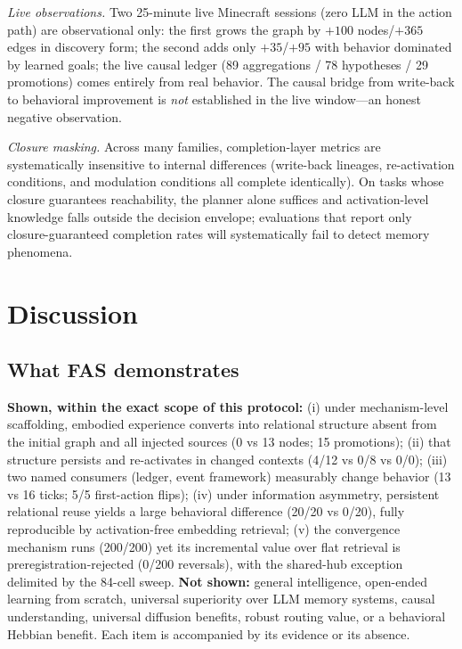 \documentclass[10pt,a4paper]{article}
\begin{document}
\emph{Live observations.} Two 25-minute live Minecraft sessions (zero LLM in the action path) are observational only: the first grows the graph by $+100$ nodes/$+365$ edges in discovery form; the second adds only $+35$/$+95$ with behavior dominated by learned goals; the live causal ledger (89 aggregations / 78 hypotheses / 29 promotions) comes entirely from real behavior. The causal bridge from write-back to behavioral improvement is \emph{not} established in the live window---an honest negative observation.

\emph{Closure masking.} Across many families, completion-layer metrics are systematically insensitive to internal differences (write-back lineages, re-activation conditions, and modulation conditions all complete identically). On tasks whose closure guarantees reachability, the planner alone suffices and activation-level knowledge falls outside the decision envelope; evaluations that report only closure-guaranteed completion rates will systematically fail to detect memory phenomena.

\section{Discussion}
\label{sec:discussion}

\subsection{What FAS demonstrates}
\textbf{Shown, within the exact scope of this protocol:} (i) under mechanism-level scaffolding, embodied experience converts into relational structure absent from the initial graph and all injected sources (0 vs 13 nodes; 15 promotions); (ii) that structure persists and re-activates in changed contexts (4/12 vs 0/8 vs 0/0); (iii) two named consumers (ledger, event framework) measurably change behavior (13 vs 16 ticks; 5/5 first-action flips); (iv) under information asymmetry, persistent relational reuse yields a large behavioral difference (20/20 vs 0/20), fully reproducible by activation-free embedding retrieval; (v) the convergence mechanism runs (200/200) yet its incremental value over flat retrieval is preregistration-rejected (0/200 reversals), with the shared-hub exception delimited by the 84-cell sweep. \textbf{Not shown:} general intelligence, open-ended learning from scratch, universal superiority over LLM memory systems, causal understanding, universal diffusion benefits, robust routing value, or a behavioral Hebbian benefit. Each item is accompanied by its evidence or its absence.
\end{document}
